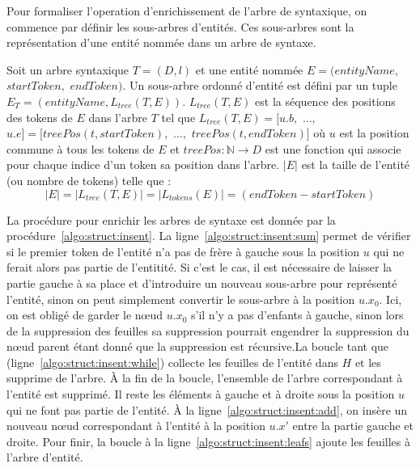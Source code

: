 Pour formaliser l'operation d'enrichissement de l'arbre de syntaxique, on commence par définir les sous-arbres d'entités.
Ces sous-arbres sont la représentation d'une entité nommée dans un arbre de syntaxe.

\begin{definition}
    \label{def:struct:entity-tree}
    Soit un arbre syntaxique $T = (D, l)$ et une entité nommée $E = (entityName,$ $startToken,$ $endToken)$.
    Un sous-arbre ordonné d'entité est défini par un tuple $E_T = (entityName, L_{tree}(T, E))$.
    $L_{tree}(T, E)$ est la séquence des positions des tokens de $E$ dans l'arbre $T$ tel que $L_{tree}(T, E) = [u.b,$ $\dots,$ $u.e]= [treePos(t, startToken),$ $\dots,$ $treePos(t, endToken)]$ où $u$ est la position commune à tous les tokens de $E$ et $treePos : \mathbb{N} \to D$ est une fonction qui associe pour chaque indice d'un token sa position dans l'arbre.
    $|E|$ est la taille de l'entité (ou nombre de tokens) telle que :
    \[
        |E| = |L_{tree}(T, E)| = |L_{tokens}(E)| = (endToken - startToken)
    \]
\end{definition}

La procédure pour enrichir les arbres de syntaxe est donnée par la procédure~\ref{algo:struct:insent}.
La ligne~\ref{algo:struct:insent:sum} permet de vérifier si le premier token de l'entité n'a pas de frère à gauche sous la position $u$ qui ne ferait alors pas partie de l'entitité.
Si c'est le cas, il est nécessaire de laisser la partie gauche à sa place et d'introduire un nouveau sous-arbre pour représenté l'entité, sinon on peut simplement convertir le sous-arbre à la position $u.x_0$.
Ici, on est obligé de garder le nœud $u.x_0$ s'il n'y a pas d'enfants à gauche, sinon lors de la suppression des feuilles sa suppression pourrait engendrer la suppression du nœud parent étant donné que la suppression est récursive.La boucle tant que (ligne~\ref{algo:struct:insent:while}) collecte les feuilles de l'entité dans $H$ et les supprime de l'arbre.
À la fin de la boucle, l'ensemble de l'arbre correspondant à l'entité est supprimé.
Il reste les éléments à gauche et à droite sous la position $u$ qui ne font pas partie de l'entité.
À la ligne~\ref{algo:struct:insent:add}, on insère un nouveau nœud correspondant à l'entité à la position $u.x'$ entre la partie gauche et droite.
Pour finir, la boucle à la ligne~\ref{algo:struct:insent:leafs} ajoute les feuilles à l'arbre d'entité.

